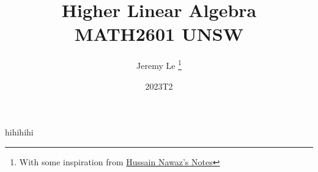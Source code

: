 \documentclass[12pt, letterpaper]{article}
\title{Higher Linear Algebra \\ MATH2601 UNSW}
\author{Jeremy Le \footnote{With some inspiration from \href{https://github.com/imagine-hussain/math2601_notes/blob/main/main.pdf}{Hussain Nawaz's Notes}}}
\date{2023T2}
\begin{document}
\maketitle
hihihihi

\tableofcontents
\newpage
    
    
    
    
    
    
\end{document}
